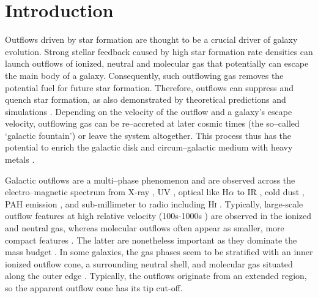 
\section{Introduction}

Outflows driven by star formation are thought to be a crucial driver of galaxy evolution. Strong stellar feedback caused by high star formation rate densities can launch outflows of ionized, neutral and molecular gas that potentially can escape the main body of a galaxy. Consequently, such outflowing gas removes the potential fuel for future star formation. Therefore, outflows can suppress and quench star formation, as also demonstrated by theoretical predictions and simulations \citep[e.g.][]{1986ApJ...303...39D,2017MNRAS.466.1213K,2018ApJ...857..116M}. Depending on the velocity of the outflow and a galaxy's escape velocity, outflowing gas can be re--accreted at later cosmic times (the so--called `galactic fountain') or leave the system altogether. This process thus has the potential to enrich the galactic disk and circum--galactic medium with heavy metals \citep[e.g.][]{Oppenheimer:2006eq,2010MNRAS.406.2325O,Hopkins:2012ez,Christensen:2018ka}.

Galactic outflows are a multi--phase phenomenon and are observed across the electro--magnetic spectrum from X-ray \citep[e.g.][]{2007ApJ...658..258S}, UV \citep[e.g.][]{2005ApJ...619L..99H}, optical like H$\alpha$ \citep[e.g.][]{2009ApJ...696..192W} to IR \citep[e.g.][]{2009ApJ...700L.149V}, cold dust \citep[e.g.][]{2010A&A...518L..66R}, PAH emission \citep[e.g.][]{2006ApJ...642L.127E}, and sub-millimeter to radio including H\textsc{i} \citep[e.g.][]{2013Natur.499..450B,2015ApJ...814...83L,Lucero:2015if}. Typically, large-scale outflow features at high relative velocity (100s-1000s \kms) are observed in the ionized and neutral gas, whereas molecular outflows often appear as smaller, more compact features \citep{Strickland:2002kp,Westmoquette:2011bp}. The latter are nonetheless important as they dominate the mass budget \citep{2015ApJ...814...83L}. In some galaxies, the gas phases seem to be stratified with an inner ionized outflow cone, a surrounding neutral shell, and molecular gas situated along the outer edge \citep[e.g.][]{2015ApJ...801...63M}. Typically, the outflows originate from an extended region, so the apparent outflow cone has its tip cut-off. 


